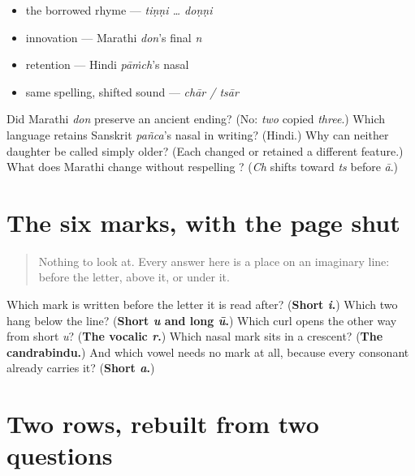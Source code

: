 \begin{itemize}
\raggedright
  \item the borrowed rhyme — \emph{tiṇṇi … doṇṇi}
  \item innovation — Marathi \emph{don}'s final \emph{n}
  \item retention — Hindi \emph{pāṁch}'s nasal
  \item same spelling, shifted sound — \emph{chār / tsār}
\end{itemize}

\begin{tcolorbox}[breakable,colback=teal!4,colframe=teal!35!black,title={Before you move on}]
Did Marathi \emph{don} preserve an ancient ending? (No: \emph{two} copied \emph{three}.) Which language retains Sanskrit \emph{pañca}'s nasal in writing? (Hindi.) Why can neither daughter be called simply older? (Each changed or retained a different feature.) What does Marathi change without respelling \textbf{}? (\emph{Ch} shifts toward \emph{ts} before \emph{ā}.)
\end{tcolorbox}
\section[six marks (sahā khuṇā)]{The six marks, with the page shut}

\label{lesson:MR-R13-marks-r3}



\begin{quote}
Nothing to look at. Every answer here is a place on an imaginary line: before the letter, above it, or under it.
\end{quote}

\begin{tcolorbox}[breakable,colback=teal!4,colframe=teal!35!black,title={Before you move on}]
Which mark is written before the letter it is read after? (\textbf{Short \emph{i}.}) Which two hang below the line? (\textbf{Short \emph{u} and long \emph{ū}.}) Which curl opens the other way from short \emph{u}? (\textbf{The vocalic \emph{r}.}) Which nasal mark sits in a crescent? (\textbf{The candrabindu.}) And which vowel needs no mark at all, because every consonant already carries it? (\textbf{Short \emph{a}.})
\end{tcolorbox}
\section[two rows (don olī)]{Two rows, rebuilt from two questions}

